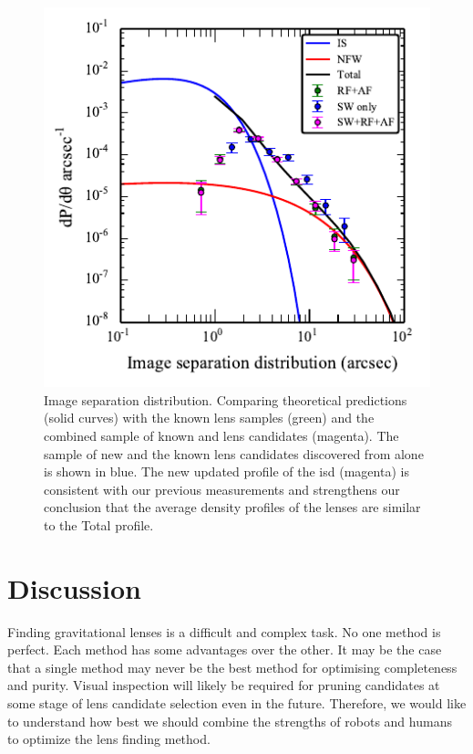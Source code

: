 \documentclass[useAMS,usenatbib,a4paper]{mn2e}
\begin{document}
\begin{figure}
\begin{center}
\includegraphics[scale=1.2]{sw-cfhtls-figs/isd_cfhtls_sw.pdf}
\caption{ \label{fig:isd} Image separation distribution. Comparing theoretical
predictions (solid curves) with the \cfhtls known lens samples (green)
and the combined sample of known and \sw lens candidates (magenta). The
sample of new and the known lens candidates discovered from \sw alone is
shown in blue. The new updated profile of the isd (magenta) is
consistent with our previous measurements and strengthens our conclusion
that the average density profiles of the lenses are similar to the Total
profile.}
\end{center}
\end{figure}

\section{Discussion}
\label{sec:discuss}

Finding gravitational lenses is a difficult and complex task. No one
method is perfect. Each method has some advantages over the other. It
may be the case that a single method may never be the best method for
optimising completeness and purity. Visual inspection will likely be
required for pruning candidates at some stage of lens candidate
selection even in the future. Therefore, we would like to understand how
best we should combine the strengths of robots and humans to optimize
the lens finding method.
\end{document}
